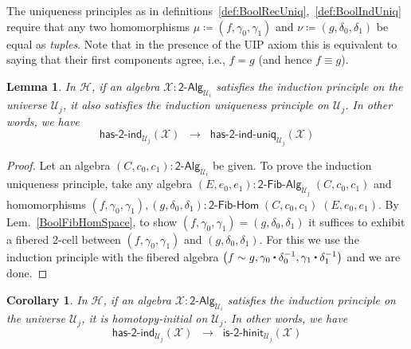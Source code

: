 \documentclass[reqno,10pt,a4paper,oneside]{amsart}
\newcommand{\X}{\mathcal{X}}
\newcommand{\defeq}{\coloneqq}
\newcommand{\UU}{\mathcal{U}}
\newcommand{\BoolAlg}{\mathsf{2}\text{-}\mathsf{Alg}}
\newcommand{\HasBoolRec}{\mathsf{has}\text{-}\mathsf{2}\text{-}\mathsf{rec}}
\newcommand{\HasBoolInd}{\mathsf{has}\text{-}\mathsf{2}\text{-}\mathsf{ind}}
\newcommand{\HasBoolRecUniq}{\mathsf{has}\text{-}\mathsf{2}\text{-}\mathsf{rec}\text{-}\mathsf{uniq}}
\newcommand{\HasBoolIndUniq}{\mathsf{has}\text{-}\mathsf{2}\text{-}\mathsf{ind}\text{-}\mathsf{uniq}}
\newcommand{\BoolFibAlg}{\mathsf{2}\text{-}\mathsf{Fib}\text{-}\mathsf{Alg}}
\newcommand{\BoolFibHom}{\mathsf{2}\text{-}\mathsf{Fib}\text{-}\mathsf{Hom}}
\newcommand{\IsBoolHInit}{\mathsf{is}\text{-}\mathsf{2}\text{-}\mathsf{hinit}}
\newcommand{\Hint}{\mathcal{H}}
\newcommand{\ct}{%
  \mathchoice{\mathbin{\raisebox{0.5ex}{$\displaystyle\centerdot$}}}%
             {\mathbin{\raisebox{0.5ex}{$\centerdot$}}}%
             {\mathbin{\raisebox{0.25ex}{$\scriptstyle\,\centerdot\,$}}}%
             {\mathbin{\raisebox{0.1ex}{$\scriptscriptstyle\,\centerdot\,$}}}}
\numberwithin{equation}{section}
\theoremstyle{mythm}
\newtheorem{lemma}[theorem]{Lemma}
\newtheorem{corollary}[theorem]{Corollary}
\theoremstyle{mydef}
\theoremstyle{myrmk}
\begin{document}
The uniqueness principles as in definitions~\ref{def:BoolRecUniq},~\ref{def:BoolIndUniq} require that
any two homomorphisms $\mu \defeq (f,\gamma_0,\gamma_1)$ and $\nu \defeq (g,\delta_0,\delta_1)$ be equal as \emph{tuples}.
Note that in the presence of the UIP axiom this is equivalent to saying that their first components agree, i.e., $f = g$ (and hence $f \equiv g$).



\begin{lemma}\label{lem:BoolIndImpUniqInt}
In $\Hint$, if an algebra $\X : \BoolAlg_{\UU_i}$ satisfies the induction principle on the universe $\UU_j$, it also satisfies the induction uniqueness principle on $\UU_j$. In other words, we have
\[ \HasBoolInd_{\UU_j}(\X) \;\; \rightarrow \;\; \HasBoolIndUniq_{\UU_j}(\X) \]
\end{lemma}
\begin{proof}
Let an algebra $(C,c_0,c_1) : \BoolAlg_{\UU_i}$ be given. To prove the induction uniqueness principle, take any algebra $(E,e_0,e_1) : \BoolFibAlg_{\UU_j} \; (C,c_0,c_1)$ and homomorphisms $(f,\gamma_0, \gamma_1), (g,\delta_0,\delta_1) : \BoolFibHom \; (C,c_0,c_1) \; (E,e_0,e_1)$. By Lem.~\ref{BoolFibHomSpace}, to show $(f,\gamma_0,\gamma_1) = (g,\delta_0,\delta_1)$ it suffices to exhibit a fibered 2-cell between $(f,\gamma_0,\gamma_1)$ and $(g,\delta_0,\delta_1)$. For this we use the induction principle with the fibered algebra $\big(f \sim g, \gamma_0 \ct \delta_0^{-1}, \gamma_1 \ct \delta_1^{-1}\big)$ and we are done.
\end{proof}


\begin{corollary}
In $\Hint$, if an algebra $\X : \BoolAlg_{\UU_i}$ satisfies the induction principle on the universe $\UU_j$, it is homotopy-initial on $\UU_j$. In other words, we have
\[ \HasBoolInd_{\UU_j}(\X) \;\; \rightarrow \;\; \IsBoolHInit_{\UU_j}(\X) \]
\end{corollary}
\end{document}
